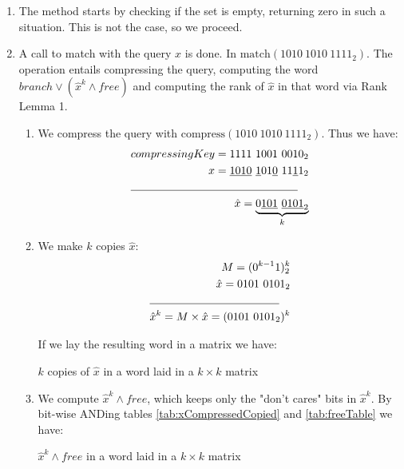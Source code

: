 \begin{enumerate}
    \item
    The method starts by checking if the set is empty, returning zero in such a situation. This is not the case, so we proceed.
    
    \item
    A call to {\ttfamily match} with the query $x$ is done. In $\text{match}(1010\ 1010\ 1111_2)$. The operation entails compressing the query, computing the word $branch \vee (\hat x^k \wedge free)$ and computing the rank of $\hat x$ in that word via Rank Lemma 1.
    \begin{enumerate}
        \item
        We compress the query with $\text{compress}(1010\ 1010\ 1111_2)$. Thus we have:
        \begin{align*}
            compressingKey = 1111\ 1001\ 0010_2\\
            x = \underline{1010}\ \underline{1}01\underline{0}\ 11\underline{1}1_2\\
            \cline{1-2}
            \hat x = \underbrace{0\underline{101}\ \underline{0101}_2}_k
        \end{align*}
        \item
        We make $k$ copies $\hat x$:
        \begin{align*}
            M = (0^{k-1}1)^k_2\\
            \hat x = 0101\ 0101_2\\
            \cline{1-2}
            \hat x^k = M \times \hat x = (0101\ 0101_2)^k\\
        \end{align*}
        
        If we lay the resulting word in a matrix we have:
        \begin{table}[H]
        \centering
        
        \caption{$k$ copies of $\hat x$ in a word laid in a $k \times k$ matrix}
        \label{tab:xCompressedCopied}
        \end{table}
        
        \item
        We compute $\hat x^k \wedge free$, which keeps only the "don't cares" bits in $\hat x^k$. By bit-wise ANDing tables \ref{tab:xCompressedCopied} and \ref{tab:freeTable} we have:
        \begin{table}[H]
        \centering
        
        \caption{$\hat x^k \wedge free$ in a word laid in a $k \times k$ matrix}
        \label{tab:xCompressedANDfree}
        \end{table}
        

\end{enumerate}
\end{enumerate}
